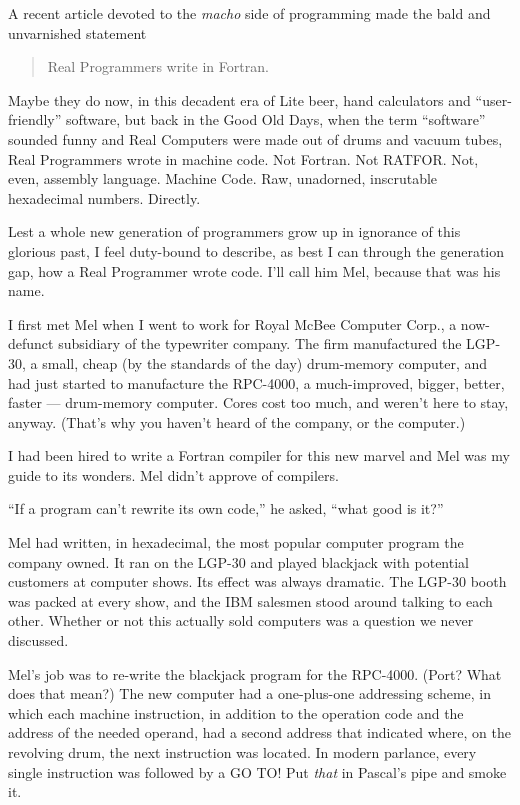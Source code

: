 \documentclass[12pt]{article}
\begin{document}
\noindent
A recent article devoted to the {\it macho} side of programming
made the bald and unvarnished statement

\begin{quote}
Real Programmers write in Fortran.
\end{quote}

\noindent
Maybe they do now, in this decadent era of Lite beer, hand
calculators and ``user-friendly'' software, but back in the
Good Old Days, when the term ``software'' sounded funny and
Real Computers were made out of drums and vacuum tubes, Real
Programmers wrote in machine code. Not Fortran. Not RATFOR.
Not, even, assembly language. Machine Code. Raw,
unadorned, inscrutable hexadecimal numbers. Directly.

\bigskip
\noindent
Lest a whole new generation of programmers grow up in
ignorance of this glorious past, I feel duty-bound to
describe, as best I can through the generation gap, how a
Real Programmer wrote code. I'll call him Mel, because that
was his name.

\bigskip
\noindent
I first met Mel when I went to work for Royal McBee Computer
Corp., a now-defunct subsidiary of the typewriter company.
The firm manufactured the LGP-30, a small, cheap (by the
standards of the day) drum-memory computer, and had just
started to manufacture the RPC-4000, a much-improved,
bigger, better, faster --- drum-memory computer. Cores cost
too much, and weren't here to stay, anyway. (That's why you
haven't heard of the company, or the computer.)

\bigskip
\noindent
I had been hired to write a Fortran compiler for this new
marvel and Mel was my guide to its wonders. Mel didn't
approve of compilers.

\bigskip
\noindent
``If a program can't rewrite its own code,'' he asked, ``what
good is it?''

\bigskip
\noindent
Mel had written, in hexadecimal, the most popular computer
program the company owned. It ran on the LGP-30 and played
blackjack with potential customers at computer shows. Its
effect was always dramatic. The LGP-30 booth was packed at
every show, and the IBM salesmen stood around talking to
each other. Whether or not this actually sold computers was
a question we never discussed.

\bigskip
\noindent
Mel's job was to re-write the blackjack program for the
RPC-4000. (Port? What does that mean?) The new computer
had a one-plus-one addressing scheme, in which each machine
instruction, in addition to the operation code and the
address of the needed operand, had a second address that
indicated where, on the revolving drum, the next instruction
was located. In modern parlance, every single instruction
was followed by a GO TO! Put {\it that} in Pascal's pipe and
smoke it.
\end{document}
